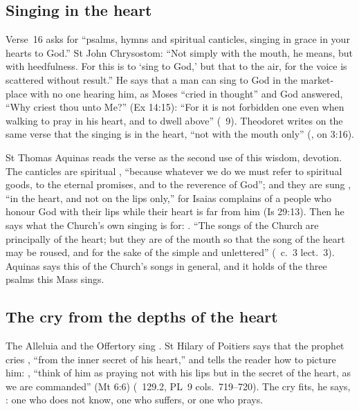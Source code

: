 \subsection{Singing in the heart}
\label{sec:heart-singing}

Verse~16 asks for ``psalms, hymns and spiritual canticles, singing in grace
in your hearts to God.'' St John Chrysostom: ``Not simply with the mouth, he
means, but with heedfulness. For this is to `sing to God,' but that to the
air, for the voice is scattered without result.'' He says that a man can sing
to God in the market-place with no one hearing him, as Moses ``cried in
thought'' and God answered, ``Why criest thou unto Me?'' (Ex 14:15): ``For it
is not forbidden one even when walking to pray in his heart, and to dwell
above'' (\ 9). Theodoret writes on the same verse that the
singing is in the heart, ``not with the mouth only'' (, on 3:16).

St Thomas Aquinas reads the verse as the second use of this wisdom, devotion.
The canticles are spiritual , ``because
whatever we do we must refer to spiritual goods, to the eternal promises, and
to the reverence of God''; and they are sung , ``in the heart, and not on the lips only,'' for Isaias
complains of a people who honour God with their lips while their heart is far
from him (Is 29:13). Then he says what the Church's own singing is for:
. ``The songs of the
Church are principally of the heart; but they are of the mouth so that the
song of the heart may be roused, and for the sake of the simple and
unlettered'' (\ c.~3 lect.~3). Aquinas says this of the
Church's songs in general, and it holds of the three psalms this Mass sings.

\subsection{The cry from the depths of the heart}
\label{sec:heart-depths}

The Alleluia and the Offertory sing . St Hilary
of Poitiers says that the prophet cries ,
``from the inner secret of his heart,'' and tells the reader how to picture
him: , ``think of him as praying not with his lips but in the secret of the
heart, as we are commanded'' (Mt 6:6) (\ 129.2, PL~9
cols.~719--720). The cry fits, he says, : one who does not know, one who suffers, or one who prays.

